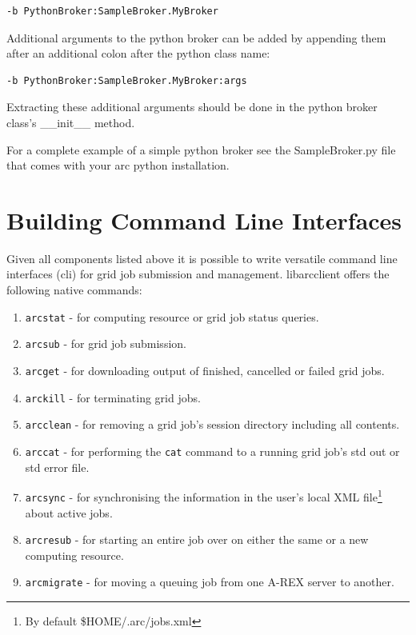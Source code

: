 \documentclass{book}
\newcommand{\libarcclient}{libarcclient}
\begin{document}
\begin{shaded}
\begin{verbatim}
-b PythonBroker:SampleBroker.MyBroker
\end{verbatim}
\end{shaded}

Additional arguments to the python broker can be added by appending
them after an additional colon after the python class name:

\begin{shaded}
\begin{verbatim}
-b PythonBroker:SampleBroker.MyBroker:args
\end{verbatim}
\end{shaded}

Extracting these additional arguments should be done in the python
broker class's \_\_init\_\_ method.

For a complete example of a simple python broker see the
SampleBroker.py file that comes with your arc python installation.

\chapter{Building Command Line Interfaces}
\label{sec:cli}

Given all components listed above it is possible to write versatile
command line interfaces (cli) for grid job submission and
management. {\libarcclient} offers the following native commands:
\begin{enumerate}
\item{\texttt{arcstat} - for computing resource or grid job status 
queries.}
\item{\texttt{arcsub} - for grid job submission.}
\item{\texttt{arcget} - for downloading output of finished, cancelled 
or failed grid jobs.}
\item{\texttt{arckill} - for terminating grid jobs.}
\item{\texttt{arcclean} - for removing a grid job's session directory 
including all contents.}
\item{\texttt{arccat} - for performing the \texttt{cat} command to a 
running grid job's std out or std error file.}
\item{\texttt{arcsync} - for synchronising the information in the user's 
local XML file\footnote{By default \$HOME/.arc/jobs.xml} about active jobs.}
\item{\texttt{arcresub} - for starting an entire job over on either the 
same or a new computing resource.}
\item{\texttt{arcmigrate} - for moving a queuing job from one A-REX 
server to another.}
\end{enumerate}
\end{document}
